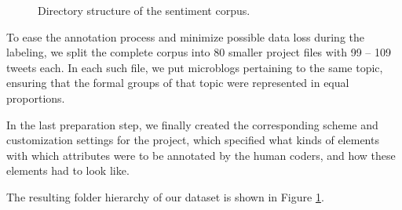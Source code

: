 \begin{figure}
  \begin{minipage}[t][21.5em]{0.5\textwidth}%
    \hspace{3em}

    \vspace{13em}
    \caption{Directory structure of the sentiment
      corpus.\label{fig:snt:corpus}}%
  \end{minipage}
\end{figure}

To ease the annotation process and minimize possible data loss during
the labeling, we split the complete corpus into 80 smaller project
files with 99 -- 109 tweets each.  In each such file, we put
microblogs pertaining to the same topic, ensuring that the formal
groups of that topic were represented in equal proportions.

In the last preparation step, we finally created the corresponding
scheme and customization settings for the project, which specified
what kinds of elements with which attributes were to be annotated by
the human coders, and how these elements had to look like.

The resulting folder hierarchy of our dataset is shown in Figure
\ref{fig:snt:corpus}.


